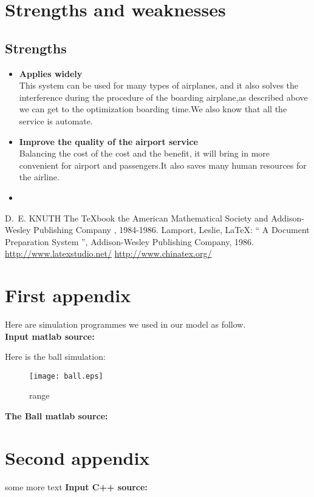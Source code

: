\documentclass{mcmthesis}
\begin{document}
\section{Strengths and weaknesses}


\subsection{Strengths}
\begin{itemize}
\item \textbf{Applies widely}\\
This  system can be used for many types of airplanes, and it also
solves the interference during  the procedure of the boarding
airplane,as described above we can get to the  optimization
boarding time.We also know that all the service is automate.
\item \textbf{Improve the quality of the airport service}\\
Balancing the cost of the cost and the benefit, it will bring in
more convenient  for airport and passengers.It also saves many
human resources for the airline. 
\item \textbf{}
\end{itemize}

\begin{thebibliography}{99}
 D.~E. KNUTH   The \TeX{}book  the American
Mathematical Society and Addison-Wesley
Publishing Company , 1984-1986.
Lamport, Leslie,  \LaTeX{}: `` A Document Preparation System '',
Addison-Wesley Publishing Company, 1986.
\url{http://www.latexstudio.net/}
\url{http://www.chinatex.org/}
\end{thebibliography}

\begin{appendices}

\section{First appendix}

Here are simulation programmes we used in our model as follow.\\

\textbf{\textcolor[rgb]{0.98,0.00,0.00}{Input matlab source:}}


Here is the ball simulation:\\

\begin{figure}[h]
\small
\centering
\texttt{[image: ball.eps]}
\caption{range} \label{fig:ball}
\end{figure}

\textbf{\textcolor[rgb]{0.98,0.00,0.00}{The Ball matlab source:}}



\section{Second appendix}

some more text \textcolor[rgb]{0.00,0.90,0.00}{\textbf{Input C++ source:}}


\end{appendices}
\end{document}
